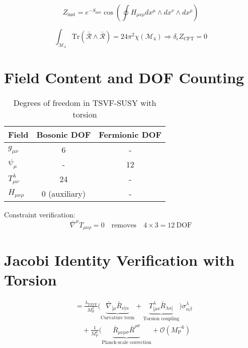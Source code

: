 \documentclass[12pt, onecolumn]{article}
\theoremstyle{definition}
\newcommand{\tsvf}{\lambda_{\mathrm{TSVF}}}
\newcommand{\Mp}{M_{\mathrm{P}}}
\numberwithin{equation}{section}
\begin{document}
\begin{appendices}
\begin{equation}  
Z_{\text{inst}} = e^{-S_{\text{inst}}}\cos\left(\oint H_{\mu\nu\rho} dx^\mu \wedge dx^\nu \wedge dx^\rho\right)
\end{equation}

\begin{equation}  
\int_{\mathcal{M}_4} \mathrm{Tr}(\bar{\mathcal{R}} \wedge \bar{\mathcal{R}}) = 24\pi^2\chi(\mathcal{M}_4) \Rightarrow \delta_\epsilon Z_{\text{CFT}} = 0
\end{equation}

\section{Field Content and DOF Counting}  
\label{app:dof}  

\begin{table}[htbp]
\centering
\caption{Degrees of freedom in TSVF-SUSY with torsion}
\begin{tabular}{lcc}
\toprule
Field & Bosonic DOF & Fermionic DOF \\
\midrule
$g_{\mu\nu}$ & 6 & - \\
$\psi_\mu$ & - & 12 \\
$T^\lambda_{\mu\nu}$ & 24 & - \\
$H_{\mu\nu\rho}$ & 0 (auxiliary) & - \\
\bottomrule
\end{tabular}
\end{table}

Constraint verification:
\begin{equation}  
\bar{\nabla}^\mu T_{\mu\nu\rho} = 0 \quad \text{removes} \quad 4\times3 = 12\ \text{DOF}
\end{equation}

\section{Jacobi Identity Verification with Torsion}  
\label{app:torsion_jacobi}  

\begin{align}
[Q_\alpha, \{Q_\beta, A_\mu\}] &= \frac{\tsvf}{\Mp^2}\biggl(\underbrace{\bar{\nabla}_{[\mu}\bar{R}_{\nu]\alpha}}_{\text{Curvature term}} + \underbrace{T^\lambda_{[\mu\nu}\bar{R}_{\lambda\alpha]}}_{\text{Torsion coupling}}\biggr)\sigma^\lambda_{\alpha\beta} \nonumber \\
&\quad + \frac{1}{\Mp^4}\biggl(\underbrace{\bar{R}_{\mu\nu\rho\sigma}\bar{R}^{\rho\sigma}}_{\text{Planck-scale correction}} + \mathcal{O}(\Mp^{-6})
\end{align}


\end{appendices}
\end{document}

